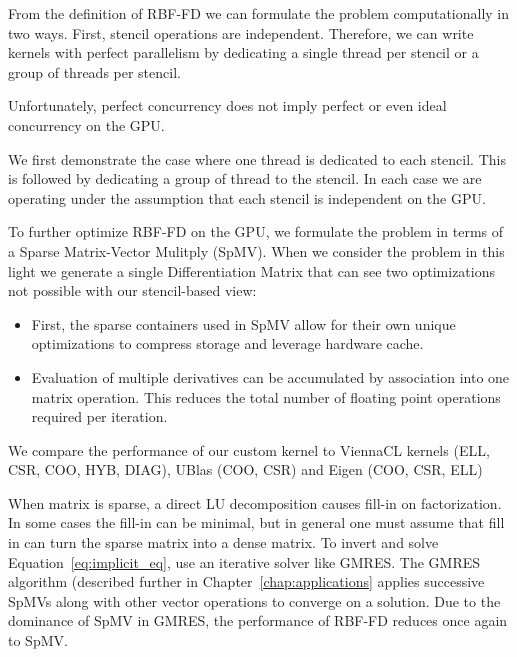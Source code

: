 \documentclass{report}
\begin{document}
From the definition of RBF-FD we can formulate the problem computationally in two ways. First, stencil operations are independent. Therefore, we can write kernels with perfect parallelism by dedicating a single thread per stencil or a group of threads per stencil.  

Unfortunately, perfect concurrency does not imply perfect or even ideal concurrency on the GPU. 

We first demonstrate the case where one thread is dedicated to each stencil. This is followed by dedicating a group of thread to the stencil. In each case we are operating under the assumption that each stencil is independent on the GPU. 

To further optimize RBF-FD on the GPU, we formulate the problem in terms of a Sparse Matrix-Vector Mulitply (SpMV). When we consider the problem in this light we generate a single Differentiation Matrix that can see two optimizations not possible with our stencil-based view: 
\begin{itemize} 
\item First, the sparse containers used in SpMV allow for their own unique optimizations to compress storage and leverage hardware cache.
\item Evaluation of multiple derivatives can be accumulated by association into one matrix operation. This reduces the total number of floating point operations required per iteration. 
\end{itemize}



We compare the performance of our custom kernel to ViennaCL kernels (ELL, CSR, COO, HYB, DIAG), UBlas (COO, CSR) and Eigen (COO, CSR, ELL)



When matrix is sparse, a direct LU decomposition causes fill-in on factorization. In some cases the fill-in can be minimal, but in general one must assume that fill in can turn the sparse matrix into a dense matrix. To invert and solve Equation~\ref{eq:implicit_eq}, use an iterative solver like GMRES. The GMRES algorithm (described further in Chapter~\ref{chap:applications} applies successive SpMVs along with other vector operations to converge on a solution. Due to the dominance of SpMV in GMRES, the performance of RBF-FD reduces once again to SpMV.
\end{document}
